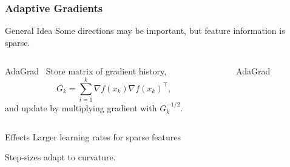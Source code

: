 \documentclass[aspectratio=1610,onlytextwidth]{beamer}
\begin{document}
\begin{frame}[c]
  \frametitle{Adaptive Gradients}

  \begin{block}{General Idea}
    Some directions may be important, but feature information is \alert{sparse}.
  \end{block}

  \pause\bigskip

  \begin{columns}
    \begin{column}{0.45\textwidth}
      \begin{block}{AdaGrad~\parencite{duchiAdaptiveSubgradientMethods2011}}
        Store matrix of gradient history,
        \[
          G_k = \sum_{i = 1}^k \nabla f(x_k) \nabla f(x_k)^\intercal,
        \]
        and update by multiplying gradient with $G_k^{-1/2}$.
      \end{block}
    \end{column}
    \begin{column}{0.45\textwidth}
      \begin{algorithm}[H]
        \caption{AdaGrad}
      \end{algorithm}
    \end{column}
  \end{columns}

  \pause\bigskip

  \begin{block}{Effects}
    Larger learning rates for sparse features

    \medskip

    Step-sizes adapt to curvature.
  \end{block}


\end{frame}
\end{document}

